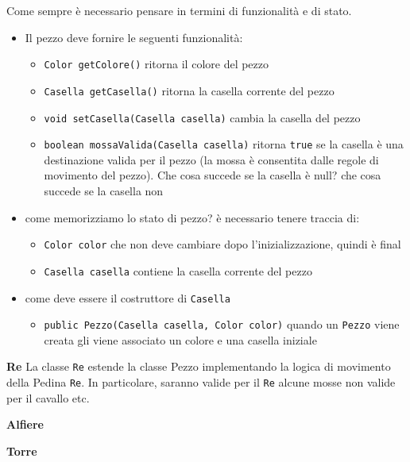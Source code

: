 \documentclass{article}
\begin{document}
Come sempre \`e necessario pensare in termini di funzionalit\`a e di stato. 
\begin{itemize}
\item Il  pezzo deve fornire le seguenti funzionalit\`a:
\begin{itemize}
\item \texttt{Color getColore()} ritorna il colore del pezzo 
\item \texttt{Casella getCasella()} ritorna la casella corrente del pezzo 
\item \texttt{void setCasella(Casella casella)} cambia la casella del pezzo
\item \texttt{boolean mossaValida(Casella casella)} ritorna \texttt{true} se la casella \`e una destinazione valida per il pezzo (la mossa \`e consentita dalle regole di movimento del pezzo). Che cosa succede se la casella \`e null?
che cosa succede se la casella non 
\end{itemize}
\item come memorizziamo lo stato di pezzo? \`e necessario tenere traccia di:
\begin{itemize}
\item \texttt{Color color} che non deve cambiare dopo l'inizializzazione, quindi \`e final
\item \texttt{Casella casella} contiene la casella corrente del pezzo
\end{itemize}
\item come deve essere il costruttore di \texttt{Casella}
\begin{itemize}
\item \texttt{public Pezzo(Casella casella, Color color)} quando un \texttt{Pezzo} viene creata gli viene associato un colore e una casella iniziale
\end{itemize}
\end{itemize}



\textbf{Re}
La classe \texttt{Re} estende la classe Pezzo implementando la logica di movimento della Pedina \texttt{Re}. In particolare, saranno valide per il \texttt{Re} alcune mosse non valide per il cavallo etc.




\textbf{Alfiere}




\textbf{Torre}

\end{document}
